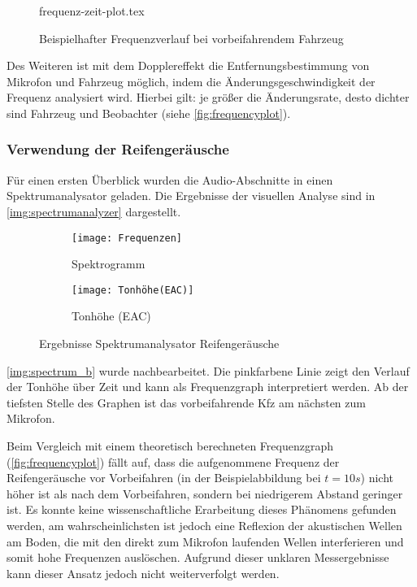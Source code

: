 \begin{figure}[h]
    \centering
    {frequenz-zeit-plot.tex}
    \caption{Beispielhafter Frequenzverlauf bei vorbeifahrendem Fahrzeug}
    \label{fig:frequencyplot}
\end{figure}

Des Weiteren ist mit dem Dopplereffekt die Entfernungsbestimmung von Mikrofon und Fahrzeug möglich, indem die Änderungsgeschwindigkeit der Frequenz analysiert wird. Hierbei gilt: je größer die Änderungsrate, desto dichter sind Fahrzeug und Beobachter (siehe \autoref{fig:frequencyplot}).

\subsubsection{Verwendung der Reifengeräusche}

Für einen ersten Überblick wurden die Audio-Abschnitte in einen Spektrumanalysator geladen. Die Ergebnisse der visuellen Analyse sind in \autoref{img:spectrumanalyzer} dargestellt.

\begin{figure}[h]
    \begin{subfigure}{.5\textwidth}
        \centering
        \texttt{[image: Frequenzen]}
        \caption{Spektrogramm}
    \end{subfigure}
    \begin{subfigure}{.5\textwidth}
        \centering
        \texttt{[image: Tonhöhe(EAC)]}
        \caption{Tonhöhe (EAC)}
        \label{img:spectrum_b}
    \end{subfigure}
    \caption{Ergebnisse Spektrumanalysator Reifengeräusche}
    \label{img:spectrumanalyzer}
\end{figure}

\autoref{img:spectrum_b} wurde nachbearbeitet. Die pinkfarbene Linie zeigt den Verlauf der Tonhöhe über Zeit und kann als Frequenzgraph interpretiert werden. Ab der tiefsten Stelle des Graphen ist das vorbeifahrende Kfz am nächsten zum Mikrofon.

Beim Vergleich mit einem theoretisch berechneten Frequenzgraph (\autoref{fig:frequencyplot}) fällt auf, dass die aufgenommene Frequenz der Reifengeräusche vor Vorbeifahren (in der Beispielabbildung bei \(t = 10 s\)) nicht höher ist als nach dem Vorbeifahren, sondern bei niedrigerem Abstand geringer ist. Es konnte keine wissenschaftliche Erarbeitung dieses Phänomens gefunden werden, am wahrscheinlichsten ist jedoch eine Reflexion der akustischen Wellen am Boden, die mit den direkt zum Mikrofon laufenden Wellen interferieren und somit hohe Frequenzen auslöschen. Aufgrund dieser unklaren Messergebnisse kann dieser Ansatz jedoch nicht weiterverfolgt werden.

